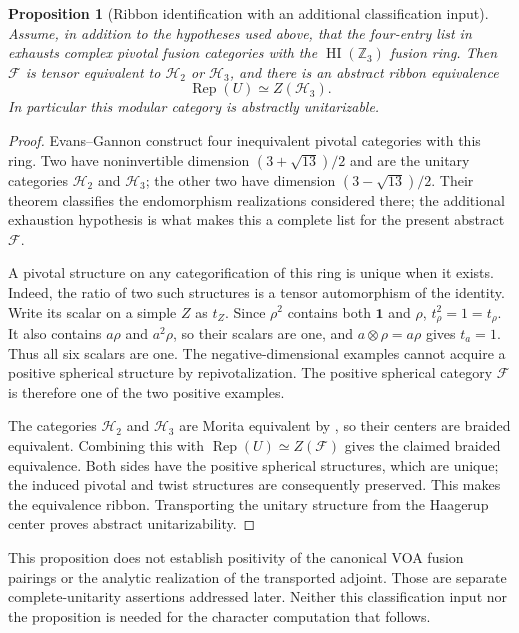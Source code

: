 \documentclass[11pt,a4paper]{article}
\newtheorem{proposition}[theorem]{Proposition}
\theoremstyle{definition}
\begin{document}
\begin{proposition}[Ribbon identification with an additional classification input]
\label{prop:optional-algebraic-identification}
Assume, in addition to the hypotheses used above, that the four-entry
list in \cite[Table~9.1]{Vercleyen} exhausts complex pivotal fusion
categories with the $\operatorname{HI}(\mathbb Z_3)$ fusion ring. Then
$\mathcal F$ is tensor equivalent to $\mathcal H_2$ or $\mathcal H_3$,
and there is an abstract ribbon equivalence
\[
 \operatorname{Rep}(U)\simeq Z(\mathcal H_3).
\]
In particular this modular category is abstractly unitarizable.
\end{proposition}
\begin{proof}
Evans--Gannon \cite[Theorem~3(ii)]{EG15} construct four inequivalent
pivotal categories with this ring. Two have noninvertible dimension
$(3+\sqrt{13})/2$ and are the unitary categories $\mathcal H_2$ and
$\mathcal H_3$; the other two have dimension $(3-\sqrt{13})/2$.
Their theorem classifies the endomorphism realizations considered
there; the additional exhaustion hypothesis is what makes this a
complete list for the present abstract $\mathcal F$.

A pivotal structure on any categorification of this ring is unique
when it exists. Indeed, the ratio of two such structures is a tensor
automorphism of the identity. Write its scalar on a simple $Z$ as
$t_Z$. Since $\rho^2$ contains both $\mathbf1$ and $\rho$,
$t_\rho^2=1=t_\rho$. It also contains $a\rho$ and $a^2\rho$,
so their scalars are one, and $a\otimes\rho=a\rho$ gives $t_a=1$.
Thus all six scalars are one. The negative-dimensional examples
cannot acquire a positive spherical structure by repivotalization.
The positive spherical category $\mathcal F$ is therefore one of the
two positive examples.

The categories $\mathcal H_2$ and $\mathcal H_3$ are Morita equivalent
by \cite[Theorem~1.4]{GS}, so their centers are braided equivalent.
Combining this with $\operatorname{Rep}(U)\simeq Z(\mathcal F)$ gives
the claimed braided equivalence. Both sides have the positive
spherical structures, which are unique; the induced pivotal and
twist structures are consequently preserved. This makes the
equivalence ribbon. Transporting the unitary structure from the
Haagerup center proves abstract unitarizability.
\end{proof}

This proposition does not establish positivity of the canonical VOA
fusion pairings or the analytic realization of the transported adjoint.
Those are separate complete-unitarity assertions addressed later.
Neither this classification input nor the proposition is needed for
the character computation that follows.
\end{document}
